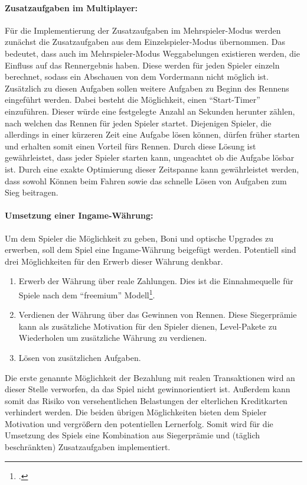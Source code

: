 		\paragraph{Zusatzaufgaben im Multiplayer:}
		Für die Implementierung der Zusatzaufgaben im Mehrspieler-Modus werden zunächst die Zusatzaufgaben aus dem Einzelspieler-Modus übernommen. Das bedeutet, dass auch im Mehrspieler-Modus Weggabelungen existieren werden, die Einfluss auf das Rennergebnis haben. Diese werden für jeden Spieler einzeln berechnet, sodass ein Abschauen von dem Vordermann nicht möglich ist. Zusätzlich zu diesen Aufgaben sollen weitere Aufgaben zu Beginn des Rennens eingeführt werden. Dabei besteht die Möglichkeit, einen \enquote{Start-Timer} einzuführen. Dieser würde eine festgelegte Anzahl an Sekunden herunter zählen, nach welchen das Rennen für jeden Spieler startet. Diejenigen Spieler, die allerdings in einer kürzeren Zeit eine Aufgabe lösen können, dürfen früher starten und erhalten somit einen Vorteil fürs Rennen.
		Durch diese Lösung ist gewährleistet, dass jeder Spieler starten kann, ungeachtet ob die Aufgabe lösbar ist. Durch eine exakte Optimierung dieser Zeitspanne kann gewährleistet werden, dass sowohl Können beim Fahren sowie das schnelle Lösen von Aufgaben zum Sieg beitragen.

		\paragraph{Umsetzung einer Ingame-Währung:}
		Um dem Spieler die Möglichkeit zu geben, Boni und optische Upgrades zu erwerben, soll dem Spiel eine Ingame-Währung beigefügt werden. Potentiell sind drei Möglichkeiten für den Erwerb dieser Währung denkbar.
		\begin{enumerate}
			\item{ Erwerb der Währung über reale Zahlungen. Dies ist die Einnahmequelle für Spiele nach dem \enquote{freemium} Modell\footcite[Seite 8]{freemium}. }
			\item{ Verdienen der Währung über das Gewinnen von Rennen. Diese Siegerprämie kann als zusätzliche Motivation für den Spieler dienen, Level-Pakete zu Wiederholen um zusätzliche Währung zu verdienen. }
			\item{ Lösen von zusätzlichen Aufgaben. }
		\end{enumerate}
		Die erste genannte Möglichkeit der Bezahlung mit realen Transaktionen wird an dieser Stelle verworfen, da das Spiel nicht gewinnorientiert ist. Außerdem kann somit das Risiko von versehentlichen Belastungen der elterlichen Kreditkarten verhindert werden.
		Die beiden übrigen Möglichkeiten bieten dem Spieler Motivation und vergrößern den potentiellen Lernerfolg. Somit wird für die Umsetzung des Spiels eine Kombination aus Siegerprämie und (täglich beschränkten) Zusatzaufgaben implementiert.

